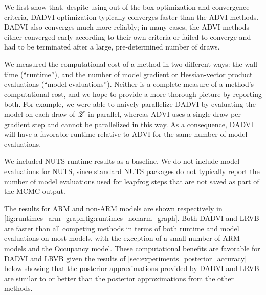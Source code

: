 \RuntimeARM{}
\RuntimeNonARM{}

We first show that, despite using out-of-the box optimization and convergence
criteria, DADVI optimization typically converges faster than the ADVI
methods. DADVI also converges much more reliably; in many cases, the
ADVI methods either converged early according to their own criteria or failed to
converge and had to be terminated after a large, pre-determined number of draws.

We measured the computational cost of a method in two different ways: the wall
time (``runtime''), and the number of model gradient or Hessian-vector product
evaluations (``model evaluations'').  Neither is a complete measure of a
method's computational cost, and we hope to provide a more thorough picture by
reporting both.  For example, we were able to naively parallelize DADVI by
evaluating the model on each draw of $\mathscr{Z}$ in parallel, whereas ADVI uses a
single draw per gradient step and cannot be parallelized in this way. As a
consequence, DADVI will have a favorable runtime relative to ADVI for the same
number of model evaluations.

We included NUTS runtime results as a baseline.  We do not include model
evaluations for NUTS, since standard NUTS packages do not typically report the
number of model evaluations used for leapfrog steps that are not saved as part
of the MCMC output.

The results for ARM and non-ARM models are shown respectively in
\cref{fig:runtimes_arm_graph,fig:runtimes_nonarm_graph}.  Both DADVI and LRVB
are faster than all competing methods in terms of both runtime and model
evaluations on most models, with the exception of a small number of ARM models
and the Occupancy model. These computational benefits are favorable for DADVI
and LRVB given the results of \cref{sec:experiments_posterior_accuracy} below
showing that the posterior approximations provided by DADVI and LRVB are similar
to or better than the posterior approximations from the other methods.
